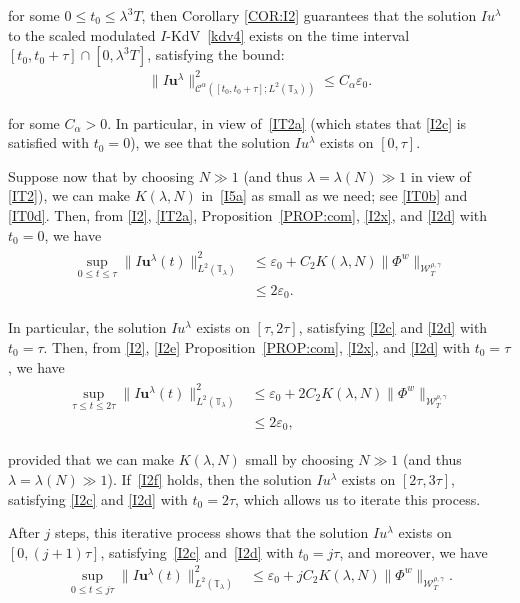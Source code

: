 \documentclass[letterpaper, 11pt,  reqno]{amsart}
\newcommand{\1}{\hspace{0.5mm}\text{I}\hspace{0.5mm}}
\newcommand{\noi}{\noindent}
\newcommand{\T}{\mathbb{T}}
\newcommand{\CC}{\mathcal{C}}
\newcommand{\al}{\alpha}
\newcommand{\eps}{\varepsilon}
\newcommand{\g}{\gamma}
\newcommand{\ld}{\lambda}
\newcommand{\W}{\mathcal{W}}
\newcommand{\uu}{\mathbf{u}}
\numberwithin{equation}{section}
\numberwithin{theorem}{section}
\begin{document}
\noi
for some 
 $0 \le t_0 \le \ld^3T$, 
then Corollary \ref{COR:I2}
guarantees that the solution $Iu^\ld$ to the scaled modulated $I$-KdV~\eqref{kdv4} exists on 
the time interval $[t_0, t_0 + \tau]\cap [0, \ld^3 T]$, satisfying the bound:
\begin{align}
 \| I\uu^\ld \|_{\CC^\al ([t_0, t_0 + \tau];L^2(\T_\ld))}^2\le C_\al \eps_0.
\label{I2d}
\end{align}

\noi
for some $C_\al > 0$.
In particular, in view of~\eqref{IT2a} (which states that \eqref{I2c} is satisfied with $t_0 = 0$), 
we see that 
 the solution $Iu^\ld$  exists on $[0, \tau]$.



Suppose now that by choosing $N \gg 1$
(and thus $\ld = \ld(N) \gg1$
in view of \eqref{IT2}), 
we can make 
 $K(\ld, N)$  in~\eqref{I5a}
as small as we need;
see \eqref{IT0b} and \eqref{IT0d}.
Then,  
from 
\eqref{I2}, \eqref{IT2a}, 
Proposition~\ref{PROP:com}, 
 \eqref{I2x}, 
and \eqref{I2d} with $t_0 = 0$,  
 we have 
\begin{align}
\begin{split}
 \sup_{0\le t\le \tau} \| I \uu^\ld(t) \|^2_{L^2(\T_\ld)} 
&  \le \eps_0 + 
C_2 K(\ld, N)   \|  \Phi^{w}  \|_{\W_{T}^{\rho, \g}}   \\
& \le 2\eps_0.
\end{split}
\label{I2e}
\end{align}

\noi
In particular, the solution $Iu^\ld$ exists on $[\tau,  2\tau]$, 
satisfying 
\eqref{I2c} and \eqref{I2d}
with $t_0 = \tau$.
Then,  
from 
\eqref{I2}, \eqref{I2e} 
Proposition~\ref{PROP:com}, 
 \eqref{I2x}, and \eqref{I2d} with $t_0 = \tau$, we have 
\begin{align}
\begin{split}
 \sup_{\tau\le t\le2 \tau} \| I \uu^\ld(t) \|^2_{L^2(\T_\ld)} 
&  \le \eps_0 + 
2 C_2 K(\ld, N)   \|  \Phi^{w}  \|_{\W_{T}^{\rho, \g}}   \\
&  \le 2\eps_0, 
\end{split}
\label{I2f}
\end{align}


\noi
provided that 
we can make 
 $K(\ld, N)$  small by 
choosing $N \gg 1$
(and thus $\ld = \ld(N) \gg1$).
If~\eqref{I2f} holds, 
then 
the solution $Iu^\ld$ exists on $[2\tau, 3\tau]$, 
satisfying 
\eqref{I2c} and \eqref{I2d}
with $t_0 = 2\tau$, 
which allows us to iterate this process.

After $j$ steps, 
this iterative process shows that 
the solution $Iu^\ld$ exists on $[0, (j+1)\tau]$, 
satisfying~\eqref{I2c} and~\eqref{I2d}
 with $t_0 = j \tau$, and moreover, we have 
\begin{align}
 \sup_{0 \le t\le j \tau} \| I \uu^\ld(t) \|^2_{L^2(\T_\ld)} 
&  \le \eps_0 + 
j C_2 K(\ld, N)   \|  \Phi^{w}  \|_{\W_{T}^{\rho, \g}}.
\label{I2g}
\end{align}
\end{document}
